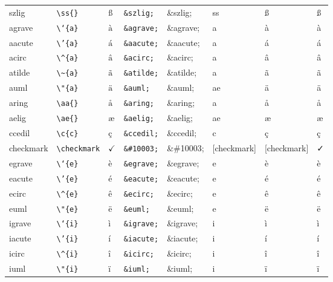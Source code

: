 \documentclass[11pt]{article}
\begin{document}
\begin{longtable}{llllllll}
szlig & \texttt{\textbackslash{}ss\{\}} & $\mbox{\ss{}}$ & \texttt{\&szlig;} & \&szlig; & ss & ß & ß\\
agrave & \texttt{\textbackslash{}`\{a\}} & $\mbox{\`{a}}$ & \texttt{\&agrave;} & \&agrave; & a & à & à\\
aacute & \texttt{\textbackslash{}'\{a\}} & $\mbox{\'{a}}$ & \texttt{\&aacute;} & \&aacute; & a & á & á\\
acirc & \texttt{\textbackslash{}\textasciicircum{}\{a\}} & $\mbox{\^{a}}$ & \texttt{\&acirc;} & \&acirc; & a & â & â\\
atilde & \texttt{\textbackslash{}\textasciitilde{}\{a\}} & $\mbox{\~{a}}$ & \texttt{\&atilde;} & \&atilde; & a & ã & ã\\
auml & \texttt{\textbackslash{}"\{a\}} & $\mbox{\"{a}}$ & \texttt{\&auml;} & \&auml; & ae & ä & ä\\
aring & \texttt{\textbackslash{}aa\{\}} & $\mbox{\aa{}}$ & \texttt{\&aring;} & \&aring; & a & å & å\\
aelig & \texttt{\textbackslash{}ae\{\}} & $\mbox{\ae{}}$ & \texttt{\&aelig;} & \&aelig; & ae & æ & æ\\
ccedil & \texttt{\textbackslash{}c\{c\}} & $\mbox{\c{c}}$ & \texttt{\&ccedil;} & \&ccedil; & c & ç & ç\\
checkmark & \texttt{\textbackslash{}checkmark} & $\checkmark$ & \texttt{\&\#10003;} & \&\#10003; & [checkmark] & [checkmark] & ✓\\
egrave & \texttt{\textbackslash{}`\{e\}} & $\mbox{\`{e}}$ & \texttt{\&egrave;} & \&egrave; & e & è & è\\
eacute & \texttt{\textbackslash{}'\{e\}} & $\mbox{\'{e}}$ & \texttt{\&eacute;} & \&eacute; & e & é & é\\
ecirc & \texttt{\textbackslash{}\textasciicircum{}\{e\}} & $\mbox{\^{e}}$ & \texttt{\&ecirc;} & \&ecirc; & e & ê & ê\\
euml & \texttt{\textbackslash{}"\{e\}} & $\mbox{\"{e}}$ & \texttt{\&euml;} & \&euml; & e & ë & ë\\
igrave & \texttt{\textbackslash{}`\{i\}} & $\mbox{\`{i}}$ & \texttt{\&igrave;} & \&igrave; & i & ì & ì\\
iacute & \texttt{\textbackslash{}'\{i\}} & $\mbox{\'{i}}$ & \texttt{\&iacute;} & \&iacute; & i & í & í\\
icirc & \texttt{\textbackslash{}\textasciicircum{}\{i\}} & $\mbox{\^{i}}$ & \texttt{\&icirc;} & \&icirc; & i & î & î\\
iuml & \texttt{\textbackslash{}"\{i\}} & $\mbox{\"{i}}$ & \texttt{\&iuml;} & \&iuml; & i & ï & ï\\

\end{longtable}
\end{document}
